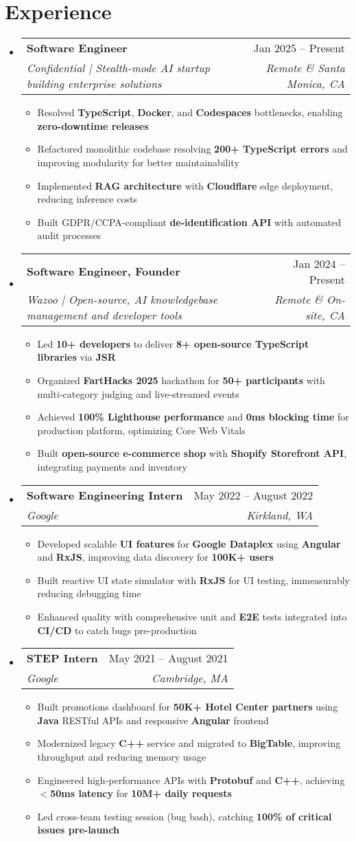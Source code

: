 \documentclass[letterpaper,11pt]{article}
\makeatletter
\newcommand{\resumeItem}[1]{
  \item\small{
    {#1 \vspace{-2pt}}
  }
}
\newcommand{\resumeSubheading}[4]{
  \vspace{-2pt}\item
    \begin{tabular*}{0.97\textwidth}[t]{l@{\extracolsep{\fill}}r}
      \textbf{#1} & #2 \\
      \textit{\small#3} & \textit{\small #4} \\
    \end{tabular*}\vspace{-7pt}
}
\newcommand{\resumeSubHeadingListStart}{\begin{itemize}[leftmargin=0.15in, label={}]}
\newcommand{\resumeSubHeadingListEnd}{\end{itemize}}
\newcommand{\resumeItemListStart}{\begin{itemize}}
\newcommand{\resumeItemListEnd}{\end{itemize}\vspace{-5pt}}
\makeatother
\begin{document}
\section{Experience}
\resumeSubHeadingListStart
  \resumeSubheading
    {Software Engineer}{Jan 2025 -- Present}
    {Confidential | Stealth-mode AI startup building enterprise solutions}{Remote \& Santa Monica, CA}
    \resumeItemListStart
      \resumeItem{Resolved \textbf{TypeScript}, \textbf{Docker}, and \textbf{Codespaces} bottlenecks, enabling \textbf{zero-downtime releases}}
      \resumeItem{Refactored monolithic codebase resolving \textbf{200+ TypeScript errors} and improving modularity for better maintainability}
      \resumeItem{Implemented \textbf{RAG architecture} with \textbf{Cloudflare} edge deployment, reducing inference costs}
      \resumeItem{Built GDPR/CCPA-compliant \textbf{de-identification API} with automated audit processes}
    \resumeItemListEnd
  
  \resumeSubheading
    {Software Engineer, Founder}{Jan 2024 -- Present}
    {Wazoo | Open-source, AI knowledgebase management and developer tools}{Remote \& On-site, CA}
    \resumeItemListStart
      \resumeItem{Led \textbf{10+ developers} to deliver \textbf{8+ open-source TypeScript libraries} via \textbf{JSR}}
      \resumeItem{Organized \textbf{FartHacks 2025} hackathon for \textbf{50+ participants} with multi-category judging and live-streamed events}
      \resumeItem{Achieved \textbf{100\% Lighthouse performance} and \textbf{0ms blocking time} for production platform, optimizing Core Web Vitals}
      \resumeItem{Built \textbf{open-source e-commerce shop} with \textbf{Shopify Storefront API}, integrating payments and inventory}
    \resumeItemListEnd

  \resumeSubheading
    {Software Engineering Intern}{May 2022 -- August 2022}
    {Google}{Kirkland, WA}
    \resumeItemListStart
      \resumeItem{Developed scalable \textbf{UI features} for \textbf{Google Dataplex} using \textbf{Angular} and \textbf{RxJS}, improving data discovery for \textbf{100K+ users}}
      \resumeItem{Built reactive UI state simulator with \textbf{RxJS} for UI testing, immeasurably reducing debugging time}
      \resumeItem{Enhanced quality with comprehensive unit and \textbf{E2E} tests integrated into \textbf{CI/CD} to catch bugs pre-production}
    \resumeItemListEnd

  \resumeSubheading
    {STEP Intern}{May 2021 -- August 2021}
    {Google}{Cambridge, MA}
    \resumeItemListStart
      \resumeItem{Built promotions dashboard for \textbf{50K+ Hotel Center partners} using \textbf{Java} RESTful APIs and responsive \textbf{Angular} frontend}
      \resumeItem{Modernized legacy \textbf{C++} service and migrated to \textbf{BigTable}, improving throughput and reducing memory usage}
      \resumeItem{Engineered high-performance APIs with \textbf{Protobuf} and \textbf{C++}, achieving \textbf{$<$50ms latency} for \textbf{10M+ daily requests}}
      \resumeItem{Led cross-team testing session (bug bash), catching \textbf{100\% of critical issues pre-launch}}
    \resumeItemListEnd
\resumeSubHeadingListEnd
\end{document}
